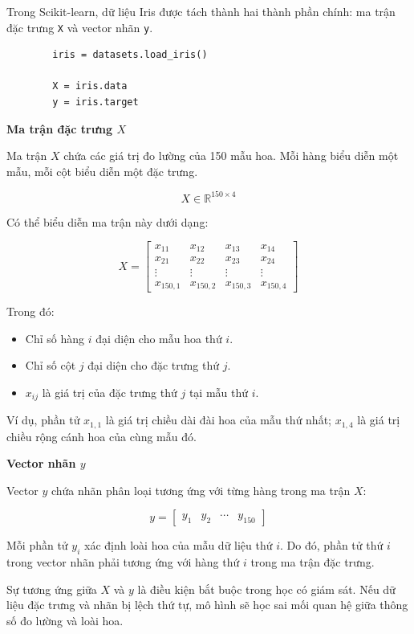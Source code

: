 \documentclass[14pt]{extarticle}
\begin{document}
	Trong Scikit-learn, dữ liệu Iris được tách thành hai thành phần chính: ma trận đặc trưng \texttt{X} và vector nhãn \texttt{y}.
	
	\begin{verbatim}
		iris = datasets.load_iris()
		
		X = iris.data
		y = iris.target
	\end{verbatim}
	
	\textbf{Ma trận đặc trưng $X$}
	
	Ma trận $X$ chứa các giá trị đo lường của 150 mẫu hoa. Mỗi hàng biểu diễn một mẫu, mỗi cột biểu diễn một đặc trưng.
	
	\[
	X\in\mathbb{R}^{150\times4}
	\]
	
	Có thể biểu diễn ma trận này dưới dạng:
	
	\[
	X=
	\begin{bmatrix}
		x_{11}&x_{12}&x_{13}&x_{14}\\
		x_{21}&x_{22}&x_{23}&x_{24}\\
		\vdots&\vdots&\vdots&\vdots\\
		x_{150,1}&x_{150,2}&x_{150,3}&x_{150,4}
	\end{bmatrix}
	\]
	
	Trong đó:
	
	\begin{itemize}
		\item Chỉ số hàng $i$ đại diện cho mẫu hoa thứ $i$.
		\item Chỉ số cột $j$ đại diện cho đặc trưng thứ $j$.
		\item $x_{ij}$ là giá trị của đặc trưng thứ $j$ tại mẫu thứ $i$.
	\end{itemize}
	
	Ví dụ, phần tử $x_{1,1}$ là giá trị chiều dài đài hoa của mẫu thứ nhất; $x_{1,4}$ là giá trị chiều rộng cánh hoa của cùng mẫu đó.
	
	\textbf{Vector nhãn $y$}
	
	Vector $y$ chứa nhãn phân loại tương ứng với từng hàng trong ma trận $X$:
	
	\[
	y=
	\begin{bmatrix}
		y_1&y_2&\cdots&y_{150}
	\end{bmatrix}
	\]
	
	Mỗi phần tử $y_i$ xác định loài hoa của mẫu dữ liệu thứ $i$. Do đó, phần tử thứ $i$ trong vector nhãn phải tương ứng với hàng thứ $i$ trong ma trận đặc trưng.
	
	Sự tương ứng giữa $X$ và $y$ là điều kiện bắt buộc trong học có giám sát. Nếu dữ liệu đặc trưng và nhãn bị lệch thứ tự, mô hình sẽ học sai mối quan hệ giữa thông số đo lường và loài hoa.
	
\end{document}
